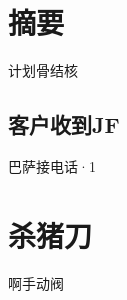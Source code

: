 \documentclass{HNUThesis}
\begin{document}
\clearpage %


\section{摘要}
计划骨结核
\subsection{客户收到JF}
巴萨接电话·1
\section{杀猪刀}
啊手动阀
\end{document}
